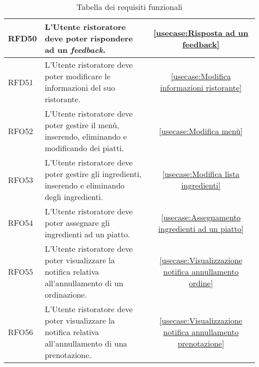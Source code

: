 \begin{table}[H]
\begin{tabularx}{\textwidth}{l|X|c}
		\hline
		RFD50       & L'Utente ristoratore deve poter rispondere ad un \textit{feedback}.                                                     & \autoref{usecase:Risposta ad un feedback}                            \\
		\hline
		RFD51       & L'Utente ristoratore deve poter modificare le informazioni del suo ristorante.                                          & \autoref{usecase:Modifica informazioni ristorante}                   \\
		\hline
		RFO52       & L'Utente ristoratore deve poter gestire il menù, inserendo, eliminando e modificando dei piatti.                        & \autoref{usecase:Modifica menù}                                      \\
		\hline
		RFO53       & L'Utente ristoratore deve poter gestire gli ingredienti, inserendo e eliminando degli ingredienti.                      & \autoref{usecase:Modifica lista ingredienti}                         \\
		\hline
		RFO54       & L'Utente ristoratore deve poter assegnare gli ingredienti ad un piatto.                                                 & \autoref{usecase:Assegnamento ingredienti ad un piatto}              \\
		\hline
		RFO55       & L'Utente ristoratore deve poter visualizzare la notifica relativa all'annullamento di un ordinazione.                   & \autoref{usecase:Visualizzazione notifica annullamento ordine}       \\
		\hline
		RFO56       & L'Utente ristoratore deve poter visualizzare la notifica relativa all'annullamento di una prenotazione.                 & \autoref{usecase:Visualizzazione notifica annullamento prenotazione} \\
		\end{tabularx}
	\caption{Tabella dei requisiti funzionali}
\end{table}

